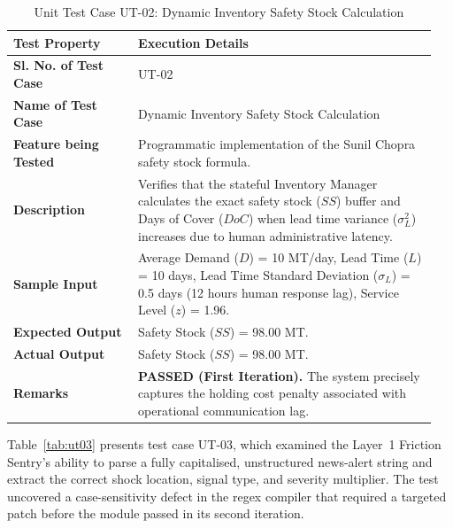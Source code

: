 \begin{table}[H]
    \centering
    \caption{Unit Test Case UT-02: Dynamic Inventory Safety Stock Calculation}
    \label{tab:ut02}
    \begin{tabular}{|p{0.28\linewidth}|p{0.67\linewidth}|}
        \hline
        \textbf{Test Property} & \textbf{Execution Details} \\ \hline
        \textbf{Sl. No. of Test Case} & UT-02 \\ \hline
        \textbf{Name of Test Case} & Dynamic Inventory Safety Stock Calculation \\ \hline
        \textbf{Feature being Tested} & Programmatic implementation of the Sunil Chopra safety stock formula. \\ \hline
        \textbf{Description} & Verifies that the stateful Inventory Manager calculates the exact safety stock ($SS$) buffer and Days of Cover ($DoC$) when lead time variance ($\sigma_L^2$) increases due to human administrative latency. \\ \hline
        \textbf{Sample Input} & Average Demand ($D$) = 10 MT/day, Lead Time ($L$) = 10 days, Lead Time Standard Deviation ($\sigma_L$) = 0.5 days (12 hours human response lag), Service Level ($z$) = 1.96. \\ \hline
        \textbf{Expected Output} & Safety Stock ($SS$) = 98.00 MT. \\ \hline
        \textbf{Actual Output} & Safety Stock ($SS$) = 98.00 MT. \\ \hline
        \textbf{Remarks} & \textbf{PASSED (First Iteration).} The system precisely captures the holding cost penalty associated with operational communication lag. \\ \hline
    \end{tabular}
\end{table}

Table~\ref{tab:ut03} presents test case UT-03, which examined the Layer~1 Friction Sentry's ability to parse a fully capitalised, unstructured news-alert string and extract the correct shock location, signal type, and severity multiplier. The test uncovered a case-sensitivity defect in the regex compiler that required a targeted patch before the module passed in its second iteration.


